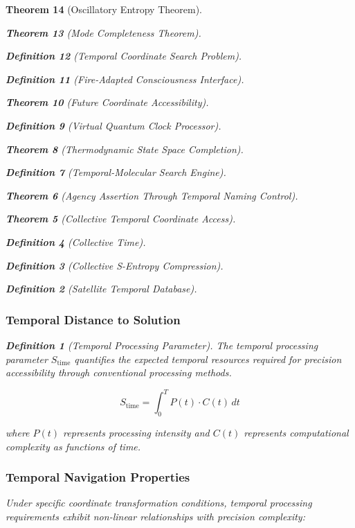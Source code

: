 \documentclass[12pt,a4paper]{article}
\newtheorem{theorem}{Theorem}[section]
\newtheorem{definition}[theorem]{Definition}
\begin{document}
\begin{theorem}[Oscillatory Entropy Theorem]
\begin{theorem}[Mode Completeness Theorem]
\begin{enumerate}
\begin{definition}[Temporal Coordinate Search Problem]
\begin{algorithm}
\begin{definition}[Fire-Adapted Consciousness Interface]
\begin{theorem}[Future Coordinate Accessibility]
\begin{definition}[Virtual Quantum Clock Processor]
\begin{itemize}
\begin{itemize}
\begin{theorem}[Thermodynamic State Space Completion]
\begin{definition}[Temporal-Molecular Search Engine]
\begin{theorem}[Agency Assertion Through Temporal Naming Control]
\begin{remark}
\begin{theorem}[Collective Temporal Coordinate Access]
\begin{definition}[Collective Time]
\begin{definition}[Collective S-Entropy Compression]
\begin{definition}[Satellite Temporal Database]
\begin{algorithm}
\begin{table}[h]
{{\subsubsection{Temporal Distance to Solution}

\begin{definition}[Temporal Processing Parameter]
The temporal processing parameter $S_{\text{time}}$ quantifies the expected temporal resources required for precision accessibility through conventional processing methods.
\end{definition}

\begin{equation}
S_{\text{time}} = \int_0^T P(t) \cdot C(t) \, dt
\label{eq:temporal_processing}
\end{equation}

where $P(t)$ represents processing intensity and $C(t)$ represents computational complexity as functions of time.

\subsubsection{Temporal Navigation Properties}

Under specific coordinate transformation conditions, temporal processing requirements exhibit non-linear relationships with precision complexity:

\begin{figure}[H]
\centering
{}
\end{figure}}}
\end{table}
\end{algorithm}
\end{definition}
\end{definition}
\end{definition}
\end{theorem}
\end{remark}
\end{theorem}
\end{definition}
\end{theorem}
\end{itemize}
\end{itemize}
\end{definition}
\end{theorem}
\end{definition}
\end{algorithm}
\end{definition}
\end{enumerate}
\end{theorem}
\end{theorem}
\end{document}
